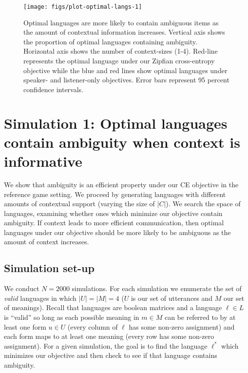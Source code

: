 \documentclass[10pt, letterpaper]{article}
\newenvironment{CodeChunk}{}{}
\begin{document}
\begin{CodeChunk}
\begin{figure*}[h]

{\centering \texttt{[image: figs/plot-optimal-langs-1]} 

}

\caption[Optimal languages are more likely to contain ambiguous items as the amount of contextual information increases]{Optimal languages are more likely to contain ambiguous items as the amount of contextual information increases. Vertical axis shows the proportion of optimal languages containing ambiguity. Horizontal axis shows the number of context-sizes (1-4). Red-line represents the optimal language under our Zipfian cross-entropy objective while the blue and red lines show optimal languages under speaker- and listener-only objectives. Error bars represent 95 percent confidence intervals.}\label{fig:plot-optimal-langs}
\end{figure*}
\end{CodeChunk}

\section{Simulation 1: Optimal languages contain ambiguity when context
is
informative}\label{simulation-1-optimal-languages-contain-ambiguity-when-context-is-informative}

We show that ambiguity is an efficient property under our CE objective
in the reference game setting. We proceed by generating languages with
different amounts of contextual support (varying the size of \(|C|\)).
We search the space of languages, examining whether ones which minimize
our objective contain ambiguity. If context leads to more efficient
communication, then optimal languages under our objective should be more
likely to be ambiguous as the amount of context increases.\par

\subsection{Simulation set-up}\label{simulation-set-up}

We conduct \(N=2000\) simulations. For each simulation we enumerate the
set of \emph{valid} languages in which \(|U|=|M|=4\) (\(U\) is our set
of utterances and \(M\) our set of meanings). Recall that languages are
boolean matrices and a language \(\ell \in L\) is ``valid'' so long as
each possible meaning in \(m \in M\) can be referred to by at least one
form \(u \in U\) (every column of \(\ell\) has some non-zero assignment)
and each form maps to at least one meaning (every row has some non-zero
assignment). For a given simulation, the goal is to find the language
\(\ell^*\) which minimizes our objective and then check to see if that
language contains ambiguity.\par
\end{document}
